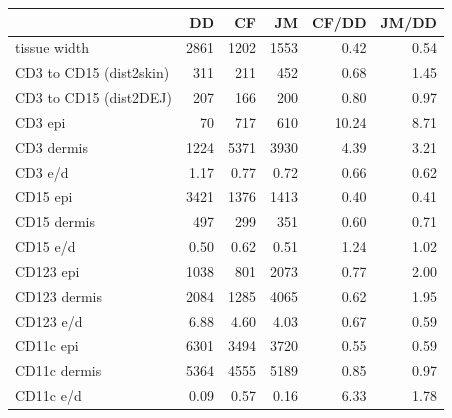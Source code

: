 \documentclass{article}
\begin{document}
\begin{tabular}{lrrrrr}
   \hline  &DD& CF& JM& CF/DD& JM/DD\\ 
\hline
tissue width & 2861 & 1202 & 1553 &  0.42 & 0.54 \\ 
  CD3 to CD15 (dist2skin) & 311 & 211 & 452 &  0.68 & 1.45 \\ 
  CD3 to CD15 (dist2DEJ) & 207 & 166 & 200 &  0.80 & 0.97 \\ 
   \hline
CD3 epi & 70 & 717 & 610 & 10.24 & 8.71 \\ 
  CD3 dermis & 1224 & 5371 & 3930 &  4.39 & 3.21 \\ 
  CD3 e/d & 1.17 & 0.77 & 0.72 &  0.66 & 0.62 \\ 
   \hline
CD15 epi & 3421 & 1376 & 1413 &  0.40 & 0.41 \\ 
  CD15 dermis & 497 & 299 & 351 &  0.60 & 0.71 \\ 
  CD15 e/d & 0.50 & 0.62 & 0.51 &  1.24 & 1.02 \\ 
   \hline
CD123 epi & 1038 & 801 & 2073 &  0.77 & 2.00 \\ 
  CD123 dermis & 2084 & 1285 & 4065 &  0.62 & 1.95 \\ 
  CD123 e/d & 6.88 & 4.60 & 4.03 &  0.67 & 0.59 \\ 
   \hline
CD11c epi & 6301 & 3494 & 3720 &  0.55 & 0.59 \\ 
  CD11c dermis & 5364 & 4555 & 5189 &  0.85 & 0.97 \\ 
  CD11c e/d & 0.09 & 0.57 & 0.16 &  6.33 & 1.78 \\ 
   \hline
\end{tabular}
\end{document}
